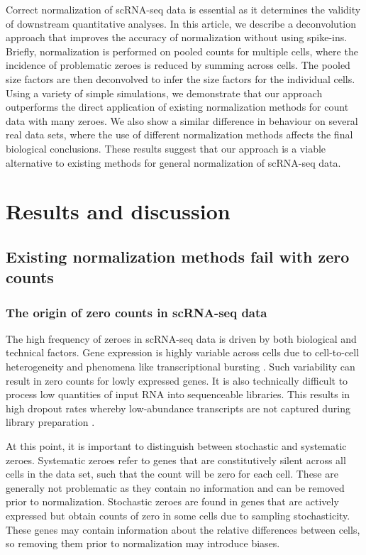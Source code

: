 \documentclass{bmcart}
\begin{document}
Correct normalization of scRNA-seq data is essential as it determines the validity of downstream quantitative analyses.
In this article, we describe a deconvolution approach that improves the accuracy of normalization without using spike-ins.
Briefly, normalization is performed on pooled counts for multiple cells, where the incidence of problematic zeroes is reduced by summing across cells.
The pooled size factors are then deconvolved to infer the size factors for the individual cells.
Using a variety of simple simulations, we demonstrate that our approach outperforms the direct application of existing normalization methods for count data with many zeroes.
We also show a similar difference in behaviour on several real data sets, where the use of different normalization methods affects the final biological conclusions.
These results suggest that our approach is a viable alternative to existing methods for general normalization of scRNA-seq data.

\section*{Results and discussion}

\subsection*{Existing normalization methods fail with zero counts}

\subsubsection*{The origin of zero counts in scRNA-seq data}
The high frequency of zeroes in scRNA-seq data is driven by both biological and technical factors.
Gene expression is highly variable across cells due to cell-to-cell heterogeneity and phenomena like transcriptional bursting \cite{marinov2014singlecell}.
Such variability can result in zero counts for lowly expressed genes.
It is also technically difficult to process low quantities of input RNA into sequenceable libraries.
This results in high dropout rates whereby low-abundance transcripts are not captured during library preparation \cite{brennecke2013accounting}.

At this point, it is important to distinguish between stochastic and systematic zeroes.
Systematic zeroes refer to genes that are constitutively silent across all cells in the data set, such that the count will be zero for each cell.
These are generally not problematic as they contain no information and can be removed prior to normalization.
Stochastic zeroes are found in genes that are actively expressed but obtain counts of zero in some cells due to sampling stochasticity.
These genes may contain information about the relative differences between cells, so removing them prior to normalization may introduce biases.
\end{document}
